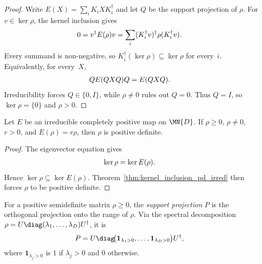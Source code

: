 \begin{proof}
    \leanok
    Write $E(X)=\sum_i K_iXK_i^\dagger$ and let $Q$ be the support
    projection of $\rho$.  For $v\in\ker\rho$, the kernel inclusion gives
    \begin{align}
        0
         & =v^\dagger E(\rho)v
          =\sum_i(K_i^\dagger v)^\dagger\rho(K_i^\dagger v).
        \notag
    \end{align}
    Every summand is non-negative, so
    $K_i^\dagger(\ker\rho)\subseteq\ker\rho$ for every~$i$.  Equivalently,
    for every~$X$,
    \begin{align}
        Q E(QXQ)Q
         & =E(QXQ).
        \notag
    \end{align}
    Irreducibility forces $Q\in\{0,I\}$, while $\rho\neq0$ rules out
    $Q=0$.  Thus $Q=I$, so $\ker\rho=\{0\}$ and $\rho>0$.
\end{proof}

\begin{theorem}
    \label{thm:psd_eigenvector_pd_irred}
    \leanok
    Let $E$ be an irreducible completely positive map on $\MN{D}$.
    If $\rho\geq0$, $\rho\neq0$, $r>0$, and
    $E(\rho)=r\rho$, then $\rho$ is positive definite.
\end{theorem}

\begin{proof}
    \leanok
    The eigenvector equation gives
    \begin{align}
        \ker\rho
         & =\ker E(\rho).
        \notag
    \end{align}
    Hence $\ker\rho\subseteq\ker E(\rho)$.
    Theorem~\ref{thm:kernel_inclusion_pd_irred} then forces $\rho$ to be
    positive definite.
\end{proof}

\begin{definition}\label{def:support_proj}
    \leanok
    For a positive semidefinite matrix $\rho\ge0$, the \emph{support
        projection} $P$ is the orthogonal projection onto the range of $\rho$.
    Via the spectral decomposition
    $\rho=U\diag(\lambda_1,\ldots,\lambda_D)U^\dagger$, it is
    \begin{align}
        P
         & =
        U\diag\!\bigl(        \mathbf{1}_{\lambda_1>0},\ldots,
        \mathbf{1}_{\lambda_D>0}
        \bigr)U^\dagger,
        \label{eq:qpf_support_projection}
    \end{align}
    where $\mathbf{1}_{\lambda_j>0}$ is $1$ if $\lambda_j>0$ and $0$ otherwise.
\end{definition}

